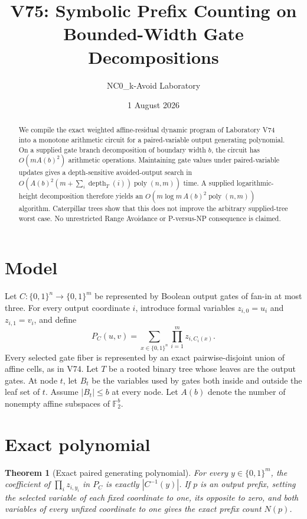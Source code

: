 \documentclass[11pt]{article}
\title{V75: Symbolic Prefix Counting on Bounded-Width Gate Decompositions}
\author{NC0\_k-Avoid Laboratory}
\date{1 August 2026}
\newtheorem{theorem}{Theorem}
\newcommand{\F}{\mathbb{F}}
\begin{document}
\maketitle

\begin{abstract}
We compile the exact weighted affine-residual dynamic program of Laboratory V74
into a monotone arithmetic circuit for a paired-variable output generating
polynomial.  On a supplied gate branch decomposition of boundary width $b$,
the circuit has $O(mA(b)^2)$ arithmetic operations.  Maintaining gate values
under paired-variable updates gives a depth-sensitive avoided-output search in
$O(A(b)^2(m+\sum_i\operatorname{depth}_T(i))\operatorname{poly}(n,m))$ time.
A supplied logarithmic-height decomposition therefore yields an
$O(m\log m\,A(b)^2\operatorname{poly}(n,m))$ algorithm.  Caterpillar trees show
that this does not improve the arbitrary supplied-tree worst case.  No
unrestricted Range Avoidance or P-versus-NP consequence is claimed.
\end{abstract}

\section{Model}
Let $C:\{0,1\}^n\to\{0,1\}^m$ be represented by Boolean output gates of
fan-in at most three.  For every output coordinate $i$, introduce formal
variables $z_{i,0}=u_i$ and $z_{i,1}=v_i$, and define
\[
 P_C(u,v)=\sum_{x\in\{0,1\}^n}\prod_{i=1}^m z_{i,C_i(x)}.
\]
Every selected gate fiber is represented by an exact pairwise-disjoint union
of affine cells, as in V74.  Let $T$ be a rooted binary tree whose leaves are
the output gates.  At node $t$, let $B_t$ be the variables used by gates both
inside and outside the leaf set of $t$.  Assume $|B_t|\le b$ at every node.
Let $A(b)$ denote the number of nonempty affine subspaces of $\F_2^b$.

\section{Exact polynomial}
\begin{theorem}[Exact paired generating polynomial]
For every $y\in\{0,1\}^m$, the coefficient of
$\prod_i z_{i,y_i}$ in $P_C$ is exactly $|C^{-1}(y)|$.  If $p$ is an output
prefix, setting the selected variable of each fixed coordinate to one, its
opposite to zero, and both variables of every unfixed coordinate to one gives
the exact prefix count $N(p)$.
\end{theorem}
\end{document}
